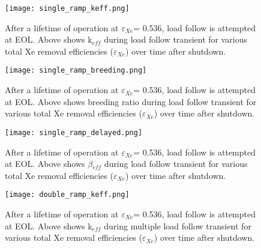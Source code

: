 \begin{itemize}
    \begin{figure}[htbp!]
        \begin{center}
            \texttt{[image: single\_ramp\_keff.png]}
        \end{center}
        \caption{After a lifetime of operation at $\varepsilon$$_{Xe}$= 0.536, 
            load follow is attempted at EOL. Above shows k$_{eff}$ during load 
            follow transient for various total Xe removal efficiencies
        ($\varepsilon$$_{Xe}$) over time after shutdown.}
        \label{fig:single_keff}
    \end{figure}

    \begin{figure}[htbp!]
        \begin{center}
            \texttt{[image: single\_ramp\_breeding.png]}
        \end{center}
        \caption{After a lifetime of operation at $\varepsilon$$_{Xe}$= 0.536, 
            load follow is attempted at EOL. Above shows breeding ratio during 
            load
        follow transient for various total Xe removal efficiencies
        ($\varepsilon$$_{Xe}$) over time after shutdown.}
        \label{fig:single_breed}
    \end{figure}

    \begin{figure}[htbp!]
        \begin{center}
            \texttt{[image: single\_ramp\_delayed.png]}
        \end{center}
        \caption{After a lifetime of operation at $\varepsilon$$_{Xe}$= 0.536, 
            load follow is attempted at EOL. Above shows $\beta$$_{eff}$ during 
            load
        follow transient for various total Xe removal efficiencies
        ($\varepsilon$$_{Xe}$) over time after shutdown.}
        \label{fig:single_delayed}
    \end{figure}

    \begin{figure}[htbp!]
        \begin{center}
            \texttt{[image: double\_ramp\_keff.png]}
        \end{center}
        \caption{After a lifetime of operation at $\varepsilon$$_{Xe}$= 0.536, 
            load follow is attempted at EOL. Above shows k$_{eff}$ during 
            multiple load follow transient for various total Xe removal 
            efficiencies
        ($\varepsilon$$_{Xe}$) over time after shutdown.}
        \label{fig:double_keff}
    \end{figure}


\end{itemize}
